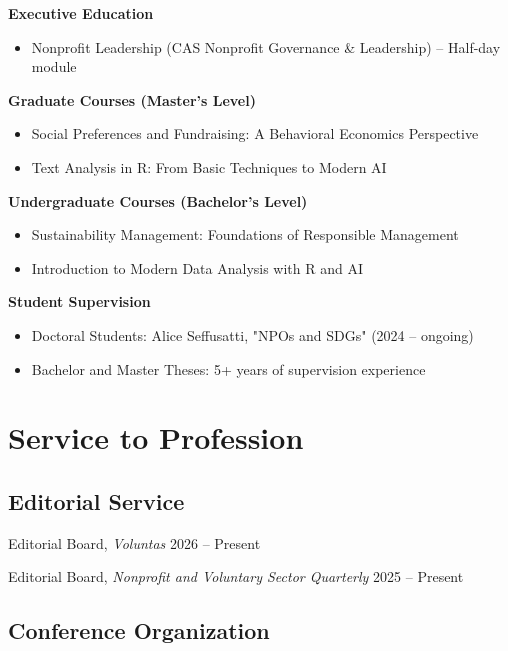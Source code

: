 \documentclass[11pt,letterpaper]{article}
\begin{document}
\textbf{Executive Education}
\begin{itemize}[leftmargin=*, itemsep=0.2em]
    \item Nonprofit Leadership (CAS Nonprofit Governance \& Leadership) -- Half-day module
\end{itemize}

\textbf{Graduate Courses (Master's Level)}
\begin{itemize}[leftmargin=*, itemsep=0.2em]
    \item Social Preferences and Fundraising: A Behavioral Economics Perspective
    \item Text Analysis in R: From Basic Techniques to Modern AI
\end{itemize}

\textbf{Undergraduate Courses (Bachelor's Level)}
\begin{itemize}[leftmargin=*, itemsep=0.2em]
    \item Sustainability Management: Foundations of Responsible Management
    \item Introduction to Modern Data Analysis with R and AI
\end{itemize}

\textbf{Student Supervision}
\begin{itemize}[leftmargin=*, itemsep=0.2em]
    \item Doctoral Students: Alice Seffusatti, "NPOs and SDGs" (2024 -- ongoing)
    \item Bachelor and Master Theses: 5+ years of supervision experience
\end{itemize}

\section*{Service to Profession}

\subsection*{Editorial Service}

Editorial Board, \textit{Voluntas} \hfill 2026 -- Present

Editorial Board, \textit{Nonprofit and Voluntary Sector Quarterly} \hfill 2025 -- Present

\subsection*{Conference Organization}
\end{document}
